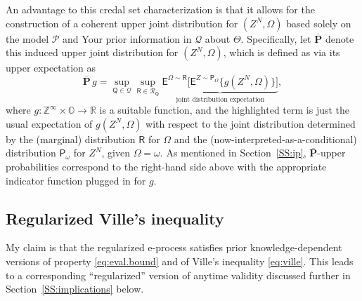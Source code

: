 \documentclass[a4paper, 12pt]{article}
\theoremstyle{plain}
\theoremstyle{definition}
\theoremstyle{remark}
\newcommand{\prob}{\mathsf{P}}
\newcommand{\E}{\mathsf{E}}
\newcommand{\RR}{\mathbb{R}}
\newcommand{\OO}{\mathbb{O}}
\newcommand{\ZZ}{\mathbb{Z}}
\newcommand{\model}{\mathscr{P}}
\newcommand{\prior}{\mathsf{Q}}
\newcommand{\credal}{\mathscr{Q}}
\newcommand{\pbcred}{\mathscr{R}}
\newcommand{\pb}{\mathsf{R}}
\newcommand{\uuprob}{\mathbf{\overline{P}}}
\begin{document}
An advantage to this credal set characterization is that it allows for the construction of a coherent upper joint distribution for $(Z^N, \Omega)$ based solely on the model $\model$ and Your prior information in $\credal$ about $\Theta$.  
Specifically, let $\uuprob$ denote this induced upper joint distribution for $(Z^N, \Omega)$, which is defined as via its upper expectation as 
\begin{equation}
\label{eq:uuprob}
\uuprob \, g = \sup_{\prior \in \credal} \sup_{\pb \in \pbcred_\prior} \underbrace{\E^{\Omega \sim \pb} \bigl[ \E^{Z \sim \prob_\Omega}\{ g(Z^N, \Omega) \} \bigr]}_{\text{joint distribution expectation}}, 
\end{equation}
where $g: \ZZ^\infty \times \OO \to \RR$ is a suitable function, and the highlighted term is just the usual expectation of $g(Z^N, \Omega)$ with respect to the joint distribution determined by the (marginal) distribution $\pb$ for $\Omega$ and the (now-interpreted-as-a-conditional) distribution $\prob_\omega$ for $Z^N$, given $\Omega=\omega$.  As mentioned in Section~\ref{SS:ip}, $\uuprob$-upper probabilities correspond to the right-hand side above with the appropriate indicator function plugged in for $g$.  




\subsection{Regularized Ville's inequality}
\label{SS:reg.ville}

My claim is that the regularized e-process satisfies prior knowledge-dependent versions of property \eqref{eq:eval.bound} and of Ville's inequality \eqref{eq:ville}.  This leads to a corresponding ``regularized'' version of anytime validity discussed further in Section~\ref{SS:implications} below. 
\end{document}
